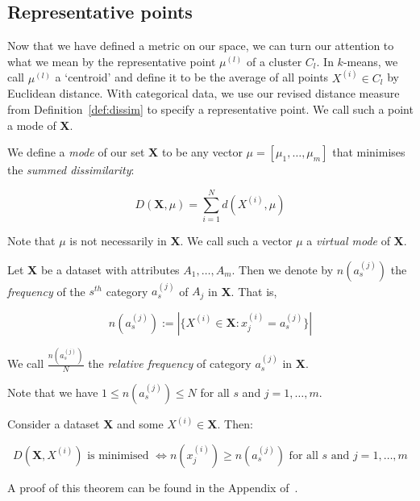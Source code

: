 \subsection{Representative points}\label{subsec:rep-points}

Now that we have defined a metric on our space, we can turn our attention to 
what we mean by the representative point \(\mu^{(l)}\) of a cluster \(C_l\). In 
\(k\)-means, we call \(\mu^{(l)}\) a `centroid' and define it to be the average 
of all points \(X^{(i)} \in C_l\) by Euclidean distance. With categorical data, 
we use our revised distance measure from Definition~\ref{def:dissim} to specify 
a representative point. We call such a point a mode of \textbf{X}.\\

\begin{definition}\label{def:mode}
    We define a \emph{mode} of our set \textbf{X} to be any vector \(\mu = 
    [\mu_1, \ldots, \mu_m]\) that minimises the \emph{summed dissimilarity}:
	
    \begin{equation}
        D(\textbf{X}, \mu) = \sum_{i=1}^{N} d(X^{(i)}, \mu)
	\end{equation}
	
    Note that \(\mu\) is not necessarily in \textbf{X}. We call such a vector
    \(\mu\) a \emph{virtual mode} of \textbf{X}.
\end{definition}

\begin{definition}\label{def:rel-freq}
    Let \textbf{X} be a dataset with attributes \(A_1, \ldots, A_m\). Then we
    denote by \(n(a_s^{(j)})\) the \emph{frequency} of the \(s^{th}\) category 
    \(a_s^{(j)}\) of \(A_j\) in \textbf{X}. That is, 
	
    \[
	    n(a_s^{(j)}) := |{\{X^{(i)} \in \textbf{X}: x_j^{(i)} = a_s^{(j)}\}}|
	\]
	
    We call \(\frac{n(a_s^{(j)})}{N}\) the \emph{relative frequency} of category 
    \(a_s^{(j)}\) in \textbf{X}.
\end{definition}

\begin{remark}
    Note that we have \(1 \le n(a_s^{(j)}) \le N\) for all \(s\) and \(j = 1, 
    \ldots, m\).\\
\end{remark}

\begin{theorem}\label{thm:1}
    Consider a dataset \textbf{X} and some \(X^{(i)} \in \textbf{X}\). Then:
	
    \[
	    D(\textbf{X}, X^{(i)}) \text{ is minimised } \iff n(x_j^{(i)}) \geq 
	    n(a_s^{(j)}) \text{ for all } s \text{ and } j = 1, \ldots, m 
	\]
\end{theorem}
A proof of this theorem can be found in the Appendix of~\cite{Huang98}.\\

